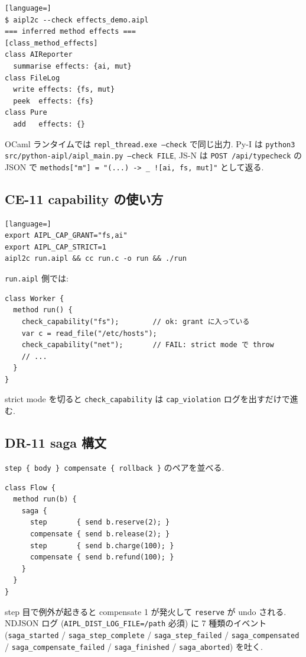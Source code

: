 \documentclass[11pt,a4paper]{article}
\begin{document}
\begin{lstlisting}[language=]
$ aipl2c --check effects_demo.aipl
=== inferred method effects ===
[class_method_effects]
class AIReporter
  summarise effects: {ai, mut}
class FileLog
  write effects: {fs, mut}
  peek  effects: {fs}
class Pure
  add   effects: {}
\end{lstlisting}

\noindent OCaml ランタイムでは \texttt{repl\_thread.exe --check} で同じ出力.
Py-I は \texttt{python3 src/python-aipl/aipl\_main.py --check FILE},
JS-N は \texttt{POST /api/typecheck} の JSON で
\texttt{methods["m"] = "(...) -> \_ ![ai, fs, mut]"} として返る.

\subsection{CE-11 capability の使い方}

\begin{lstlisting}[language=]
export AIPL_CAP_GRANT="fs,ai"
export AIPL_CAP_STRICT=1
aipl2c run.aipl && cc run.c -o run && ./run
\end{lstlisting}

\noindent \texttt{run.aipl} 側では:

\begin{lstlisting}
class Worker {
  method run() {
    check_capability("fs");        // ok: grant に入っている
    var c = read_file("/etc/hosts");
    check_capability("net");       // FAIL: strict mode で throw
    // ...
  }
}
\end{lstlisting}

\noindent strict mode を切ると \texttt{check\_capability} は
\texttt{cap\_violation} ログを出すだけで進む.

\subsection{DR-11 saga 構文}

\texttt{step \{ body \} compensate \{ rollback \}} のペアを並べる.

\begin{lstlisting}
class Flow {
  method run(b) {
    saga {
      step       { send b.reserve(2); }
      compensate { send b.release(2); }
      step       { send b.charge(100); }
      compensate { send b.refund(100); }
    }
  }
}
\end{lstlisting}

 step 目で例外が起きると compensate 1 が発火して
\texttt{reserve} が undo される. NDJSON ログ
(\texttt{AIPL\_DIST\_LOG\_FILE=/path} 必須) に 7 種類のイベント
(\texttt{saga\_started} / \texttt{saga\_step\_complete} /
 \texttt{saga\_step\_failed} / \texttt{saga\_compensated} /
 \texttt{saga\_compensate\_failed} / \texttt{saga\_finished} /
 \texttt{saga\_aborted}) を吐く.
\end{document}
